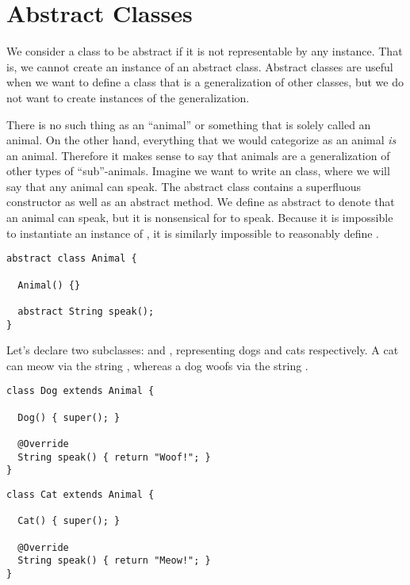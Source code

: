 \section{Abstract Classes}

We consider a class to be abstract if it is not representable by any instance. That is, we cannot create an instance of an abstract class. Abstract classes are useful when we want to define a class that is a generalization of other classes, but we do not want to create instances of the generalization.

 There is no such thing as an ``animal'' or something that is solely called an animal. On the other hand, everything that we would categorize as an animal \emph{is} an animal. Therefore it makes sense to say that animals are a generalization of other types of ``sub''-animals. Imagine we want to write an  class, where we will say that any animal can speak. The abstract class contains a superfluous constructor as well as an abstract  method. We define  as abstract to denote that an animal can speak, but it is nonsensical for  to speak. Because it is impossible to instantiate an instance of , it is similarly impossible to reasonably define .

\begin{lstlisting}[language=MyJava]
abstract class Animal {

  Animal() {} 

  abstract String speak();
}
\end{lstlisting}

Let's declare two subclasses:  and , representing dogs and cats respectively. A cat can meow via the string , whereas a dog woofs via the string . 

\begin{lstlisting}[language=MyJava]
class Dog extends Animal {

  Dog() { super(); }

  @Override
  String speak() { return "Woof!"; }
}
\end{lstlisting}

\begin{lstlisting}[language=MyJava]
class Cat extends Animal {

  Cat() { super(); }

  @Override
  String speak() { return "Meow!"; }
}
\end{lstlisting}

